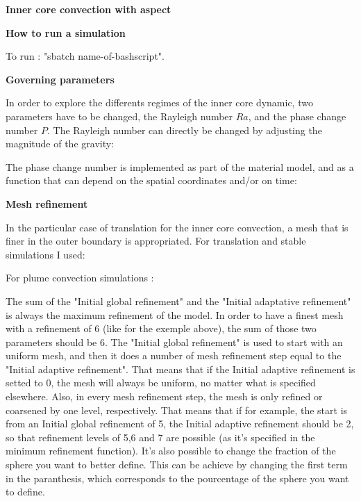 \documentclass{article}
\begin{document}
\begin{center}
\textbf{\large{Inner core convection with aspect}}
\end{center}


\vspace{0.2cm}
\textbf{How to run a simulation}
\vspace{0.2cm}



To run : "sbatch name-of-bashscript".

\vspace{0.2cm}
\textbf{Governing parameters}
\vspace{0.2cm}

In order to explore the differents regimes of the inner core dynamic, two parameters have to be changed, the Rayleigh number $Ra$, and the phase change number $P$.
The Rayleigh number can directly be changed by adjusting the magnitude of the gravity:

The phase change number is implemented as part of the material model, and as a function that can depend on the 
spatial coordinates and/or on time: 


\vspace{0.2cm}
\textbf{Mesh refinement}
\vspace{0.2cm}

In the particular case of translation for the inner core convection, a mesh that is finer in the outer boundary is appropriated.
For translation and stable simulations I used:


For plume convection simulations :


The sum of the "Initial global refinement" and the "Initial adaptative refinement" is always the maximum refinement of the model. In order to have a finest mesh with a refinement of 6 (like for the exemple above), the sum of those two parameters should be 6. The "Initial global refinement" is used to start with an uniform mesh, and then it does a number of mesh refinement step equal to the "Initial adaptive refinement". That means that if the Initial adaptive refinement is setted to 0, the mesh will always be uniform, no matter what is specified elsewhere. Also, in every mesh refinement step, the mesh is only refined or coarsened by one level, respectively. That means that if for example, the start is from an Initial global refinement of 5, the Initial adaptive refinement should be 2, so that refinement levels of 5,6 and 7 are possible (as it's specified in the minimum refinement function). It's also possible to change the fraction of the sphere you want to better define. This can be achieve by changing the first term in the paranthesis, which corresponds to the pourcentage of the sphere you want to define. 
\end{document}

